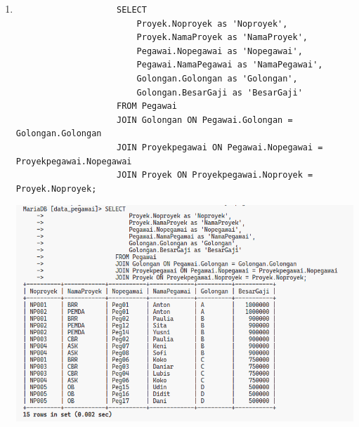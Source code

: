 \documentclass[12pt,titlepage]{article}
\begin{document}
\begin{enumerate}
{\begin{enumerate}[label=\alph*.]
{\begin{verbatim}
                    INSERT INTO Proyekpegawai
                    VALUES ('NP001', 'Peg01'),
                           ('NP001', 'Peg02'),
                           ('NP001', 'Peg06'),
                           ('NP002', 'Peg01'),
                           ('NP002', 'Peg12'),
                           ('NP002', 'Peg14'),
                           ('NP003', 'Peg02'),
                           ('NP003', 'Peg03'),
                           ('NP003', 'Peg04'),
                           ('NP004', 'Peg07'),
                           ('NP004', 'Peg08'),
                           ('NP004', 'Peg06'),
                           ('NP005', 'Peg15'),
                           ('NP005', 'Peg16'),
                           ('NP005', 'Peg17');
                \end{verbatim}
            }
            \item {
                \begin{verbatim}
                    SELECT
                        Proyek.Noproyek as 'Noproyek',
                        Proyek.NamaProyek as 'NamaProyek',
                        Pegawai.Nopegawai as 'Nopegawai',
                        Pegawai.NamaPegawai as 'NamaPegawai',
                        Golongan.Golongan as 'Golongan',
                        Golongan.BesarGaji as 'BesarGaji'
                    FROM Pegawai
                    JOIN Golongan ON Pegawai.Golongan = Golongan.Golongan
                    JOIN Proyekpegawai ON Pegawai.Nopegawai = Proyekpegawai.Nopegawai
                    JOIN Proyek ON Proyekpegawai.Noproyek = Proyek.Noproyek;
                \end{verbatim}
                \begin{center}
                    \includegraphics[width=.8\textwidth]{./images/query-all-2.png}
                \end{center}
            }
        \end{enumerate}
    }
\end{enumerate}
\end{document}
